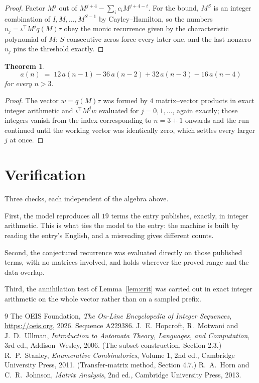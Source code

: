 \documentclass[11pt,a4paper]{article}
\theoremstyle{plain}
\newtheorem{theorem}{Theorem}
\theoremstyle{definition}
\begin{document}
\begin{proof}
Factor $M^{j}$ out of $M^{j+4}-\sum_ic_iM^{j+4-i}$. For the bound, $M^{S}$
is an integer combination of $I,M,\dots,M^{S-1}$ by Cayley--Hamilton, so the numbers
$u_j=\iota^{\!\top}M^{j}q(M)\tau$ obey the monic recurrence given by the characteristic
polynomial of $M$; $S$ consecutive zeros force every later one, and the last nonzero $u_j$
pins the threshold exactly.
\end{proof}

\begin{theorem}
\[
a(n)\;=\;12\,a(n-1) - 36\,a(n-2) + 32\,a(n-3) - 16\,a(n-4)
\]
for every $n>3$.
\end{theorem}

\begin{proof}
The vector $w=q(M)\tau$ was formed by $4$ matrix--vector products in exact integer
arithmetic and $\iota^{\!\top}M^{j}w$ evaluated for $j=0,1,\dots$, again exactly; those
integers vanish from the index corresponding to $n=3+1$ onwards and the run continued
until the working vector was identically zero, which settles every larger $j$ at once.
\end{proof}

\section{Verification}

Three checks, each independent of the algebra above.

First, the model reproduces all $19$ terms the entry publishes, exactly, in integer
arithmetic. This is what ties the model to the entry: the machine is built by reading the
entry's English, and a misreading gives different counts.

Second, the conjectured recurrence was evaluated directly on those published terms, with no
matrices involved, and holds wherever the proved range and the data overlap.

Third, the annihilation test of Lemma~\ref{lem:crit} was carried out in exact integer
arithmetic on the whole vector rather than on a sampled prefix.

\begin{thebibliography}{9}
 The OEIS Foundation, \emph{The On-Line Encyclopedia of Integer
Sequences}, \url{https://oeis.org}, 2026. Sequence A229386.
 J.~E.~Hopcroft, R.~Motwani and J.~D.~Ullman, \emph{Introduction to Automata
Theory, Languages, and Computation}, 3rd ed., Addison--Wesley, 2006. (The subset
construction, Section 2.3.)
 R.~P.~Stanley, \emph{Enumerative Combinatorics}, Volume 1, 2nd ed.,
Cambridge University Press, 2011. (Transfer-matrix method, Section 4.7.)
 R.~A.~Horn and C.~R.~Johnson, \emph{Matrix Analysis}, 2nd ed., Cambridge
University Press, 2013.
\end{thebibliography}
\end{document}
